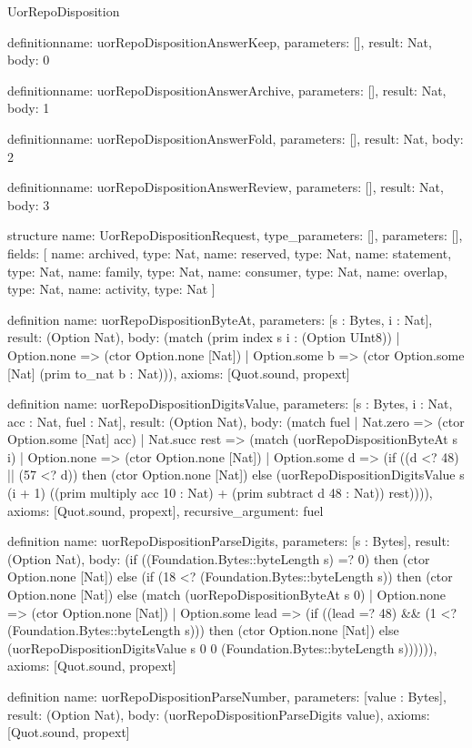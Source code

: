 \begin{lexlean}{UorRepoDisposition}
\begin{semanticmodule}
definition{name: uorRepoDispositionAnswerKeep, parameters: [], result: Nat, body: 0}

definition{name: uorRepoDispositionAnswerArchive, parameters: [], result: Nat, body: 1}

definition{name: uorRepoDispositionAnswerFold, parameters: [], result: Nat, body: 2}

definition{name: uorRepoDispositionAnswerReview, parameters: [], result: Nat, body: 3}

structure{
  name: UorRepoDispositionRequest,
  type_parameters: [],
  parameters: [],
  fields: [
    {name: archived, type: Nat},
    {name: reserved, type: Nat},
    {name: statement, type: Nat},
    {name: family, type: Nat},
    {name: consumer, type: Nat},
    {name: overlap, type: Nat},
    {name: activity, type: Nat}
  ]
}

definition{
  name: uorRepoDispositionByteAt,
  parameters: [s : Bytes, i : Nat],
  result: (Option Nat),
  body: (match (prim index s i : (Option UInt8))
    | Option.none => (ctor Option.none [Nat])
    | Option.some b => (ctor Option.some [Nat] (prim to_nat b : Nat))),
  axioms: [Quot.sound, propext]
}

definition{
  name: uorRepoDispositionDigitsValue,
  parameters: [s : Bytes, i : Nat, acc : Nat, fuel : Nat],
  result: (Option Nat),
  body: (match fuel
    | Nat.zero => (ctor Option.some [Nat] acc)
    | Nat.succ rest => (match (uorRepoDispositionByteAt s i)
      | Option.none => (ctor Option.none [Nat])
      | Option.some d => (if ((d <? 48) || (57 <? d)) then (ctor Option.none [Nat]) else (uorRepoDispositionDigitsValue s (i + 1) ((prim multiply acc 10 : Nat) + (prim subtract d 48 : Nat)) rest)))),
  axioms: [Quot.sound, propext],
  recursive_argument: fuel
}

definition{
  name: uorRepoDispositionParseDigits,
  parameters: [s : Bytes],
  result: (Option Nat),
  body: (if ((Foundation.Bytes::byteLength s) =? 0) then (ctor Option.none [Nat]) else (if (18 <? (Foundation.Bytes::byteLength s)) then (ctor Option.none [Nat]) else (match (uorRepoDispositionByteAt s 0)
    | Option.none => (ctor Option.none [Nat])
    | Option.some lead => (if ((lead =? 48) && (1 <? (Foundation.Bytes::byteLength s))) then (ctor Option.none [Nat]) else (uorRepoDispositionDigitsValue s 0 0 (Foundation.Bytes::byteLength s)))))),
  axioms: [Quot.sound, propext]
}

definition{
  name: uorRepoDispositionParseNumber,
  parameters: [value : Bytes],
  result: (Option Nat),
  body: (uorRepoDispositionParseDigits value),
  axioms: [Quot.sound, propext]
}


\end{semanticmodule}
\end{lexlean}
